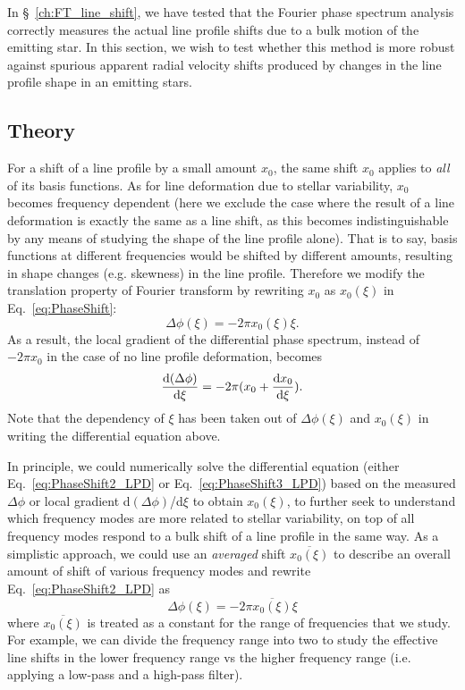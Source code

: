 In \S~\ref{ch:FT_line_shift}, we have tested that the Fourier phase spectrum analysis correctly measures the actual line profile shifts due to a bulk motion of the emitting star. In this section, we wish to test whether this method is more robust against spurious apparent radial velocity shifts produced by changes in the line profile shape in an emitting stars.


\subsection{Theory}
\label{sec:LD_Theory}

For a shift of a line profile by a small amount $x_0$, the same shift $x_0$ applies to \textit{all} of its basis functions. As for line deformation due to stellar variability, $x_0$ becomes frequency dependent (here we exclude the case where the result of a line deformation is exactly the same as a line shift, as this becomes indistinguishable by any means of studying the shape of the line profile alone). That is to say, basis functions at different frequencies would be shifted by different amounts, resulting in shape changes (e.g. skewness) in the line profile. Therefore we modify the translation property of Fourier transform by rewriting $x_0$ as $x_0(\xi)$ in Eq.~\ref{eq:PhaseShift}:
\begin{equation}
	\Delta \phi(\xi) = -2 \pi x_0(\xi) \xi.
\label{eq:PhaseShift2_LPD}
\end{equation}
As a result, the local gradient of the differential phase spectrum, instead of $-2 \pi x_0$ in the case of no line profile deformation, becomes 
\begin{equation}
	\dv{(\Delta \phi)}{\xi} = -2 \pi (x_0 + \dv{x_0}{\xi}).
\label{eq:PhaseShift3_LPD}
\end{equation}
Note that the dependency of $\xi$ has been taken out of $\Delta \phi(\xi)$ and 
$x_0(\xi)$ in writing the differential equation above. 

In principle, we could numerically solve the differential equation (either Eq.~\ref{eq:PhaseShift2_LPD} or Eq.~\ref{eq:PhaseShift3_LPD}) based on the measured $\Delta \phi$ or local gradient d$(\Delta \phi)$/d$\xi$ to obtain $x_0(\xi)$, to further seek to understand which frequency modes are more related to stellar variability, on top of all frequency modes respond to a bulk shift of a line profile in the same way. As a simplistic approach, we could use an \textit{averaged} shift $\overline{x_0(\xi)}$ to describe an overall amount of shift of various frequency modes and rewrite Eq.~\ref{eq:PhaseShift2_LPD} as 
\begin{equation}
	\Delta \phi(\xi) = -2 \pi \overline{x_0(\xi)} \xi
\end{equation}
where $\overline{x_0(\xi)}$ is treated as a constant for the range of frequencies that we study. For example, we can divide the frequency range into two to study the effective line shifts in the lower frequency range vs the higher frequency range (i.e. applying a low-pass and a high-pass filter). 

